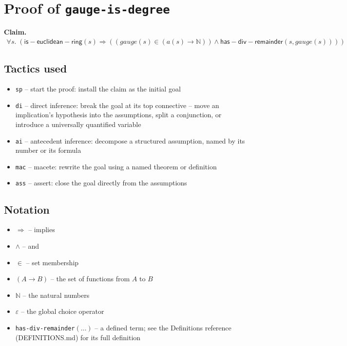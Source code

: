 \documentclass[11pt]{article}
\begin{document}
\section*{Proof of \texttt{gauge-is-degree}}
\textbf{Claim.}
\begin{align*}
  \forall s.\; (\mathsf{is{-}euclidean{-}ring}(s) \Rightarrow ((\mathit{gauge}(s) \in (a(s) \to \mathbb{N})) \wedge \mathsf{has{-}div{-}remainder}(s, \mathit{gauge}(s))))
\end{align*}
\bigskip

\subsection*{Tactics used}
\begin{itemize}
\item \texttt{sp} -- start the proof: install the claim as the initial goal
\item \texttt{di} -- direct inference: break the goal at its top connective -- move an implication's hypothesis into the assumptions, split a conjunction, or introduce a universally quantified variable
\item \texttt{ai} -- antecedent inference: decompose a structured assumption, named by its number or its formula
\item \texttt{mac} -- macete: rewrite the goal using a named theorem or definition
\item \texttt{ass} -- assert: close the goal directly from the assumptions
\end{itemize}

\subsection*{Notation}
\begin{itemize}
\item $\Rightarrow$ -- implies
\item $\wedge$ -- and
\item $\in$ -- set membership
\item $(A \to B)$ -- the set of functions from $A$ to $B$
\item $\mathbb{N}$ -- the natural numbers
\item $\varepsilon$ -- the global choice operator
\item \texttt{has-div-remainder}$(\ldots)$ -- a defined term; see the Definitions reference (DEFINITIONS.md) for its full definition
\end{itemize}
\end{document}
